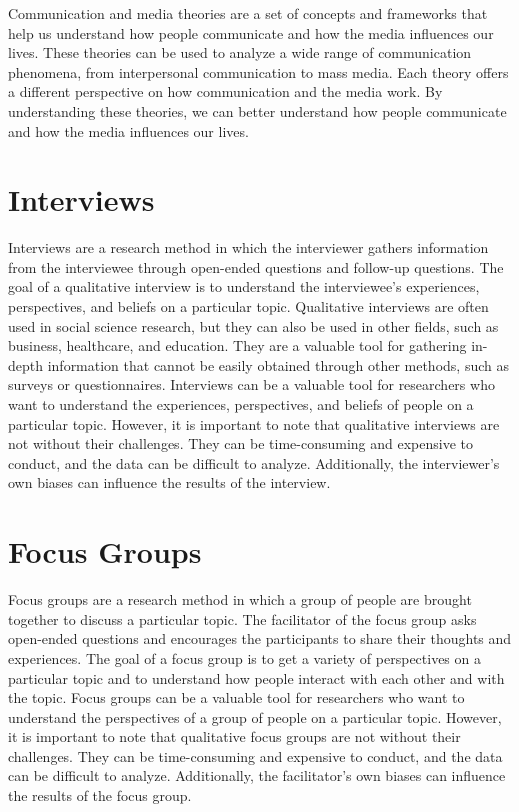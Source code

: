 \documentclass[
  b5paper]{book}
\begin{document}
Communication and media theories are a set of concepts and frameworks that help us understand how people communicate and how the media influences our lives. These theories can be used to analyze a wide range of communication phenomena, from interpersonal communication to mass media. Each theory offers a different perspective on how communication and the media work. By understanding these theories, we can better understand how people communicate and how the media influences our lives.

\hypertarget{interviews}{%
\section*{Interviews}\label{interviews}}

Interviews are a research method in which the interviewer gathers information from the interviewee through open-ended questions and follow-up questions. The goal of a qualitative interview is to understand the interviewee's experiences, perspectives, and beliefs on a particular topic. Qualitative interviews are often used in social science research, but they can also be used in other fields, such as business, healthcare, and education. They are a valuable tool for gathering in-depth information that cannot be easily obtained through other methods, such as surveys or questionnaires. Interviews can be a valuable tool for researchers who want to understand the experiences, perspectives, and beliefs of people on a particular topic. However, it is important to note that qualitative interviews are not without their challenges. They can be time-consuming and expensive to conduct, and the data can be difficult to analyze. Additionally, the interviewer's own biases can influence the results of the interview.

\hypertarget{focus-groups}{%
\section*{Focus Groups}\label{focus-groups}}

Focus groups are a research method in which a group of people are brought together to discuss a particular topic. The facilitator of the focus group asks open-ended questions and encourages the participants to share their thoughts and experiences. The goal of a focus group is to get a variety of perspectives on a particular topic and to understand how people interact with each other and with the topic. Focus groups can be a valuable tool for researchers who want to understand the perspectives of a group of people on a particular topic. However, it is important to note that qualitative focus groups are not without their challenges. They can be time-consuming and expensive to conduct, and the data can be difficult to analyze. Additionally, the facilitator's own biases can influence the results of the focus group.
\end{document}
